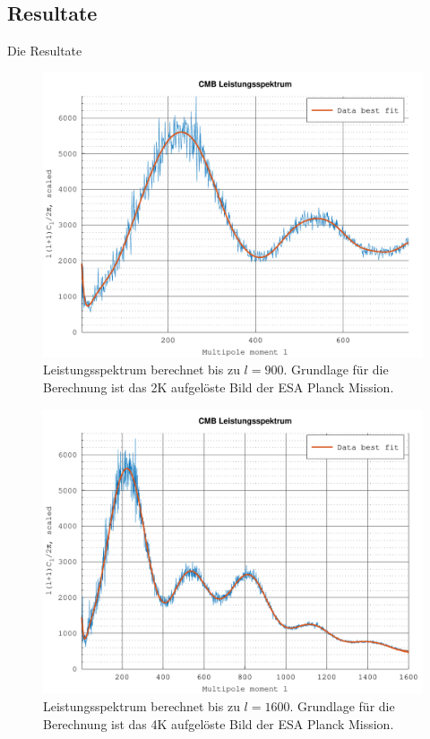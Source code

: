 \subsection{Resultate \label{subsec:cmb:results}}

Die Resultate 

\begin{figure}
	\centering
	\includegraphics[width=\linewidth]{cmb/data/2k900-500.pdf}
	\caption{Leistungsspektrum berechnet bis zu $l = 900$. Grundlage für die 
		Berechnung ist das 2K aufgelöste Bild der ESA Planck Mission.}
	\label{fig:cmb-power-spec-900}
\end{figure}

\begin{figure}
	\centering
	\includegraphics[width=\linewidth]{cmb/data/4k1800-500.pdf}
	\caption{Leistungsspektrum berechnet bis zu $l = 1600$. Grundlage für die 
		Berechnung ist das 4K aufgelöste Bild der ESA Planck Mission.}
	\label{fig:cmb-power-spec-1600}
\end{figure}

